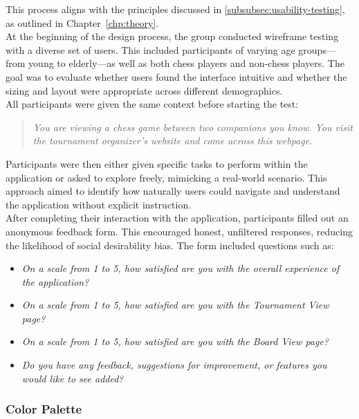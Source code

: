 This process aligns with the principles discussed in \ref{subsubsec:usability-testing}, as outlined in Chapter~\ref{chp:theory}. \\

At the beginning of the design process, the group conducted wireframe testing with a diverse set of users. This included participants of varying age groups—from young to elderly—as well as both chess players and non-chess players. The goal was to evaluate whether users found the interface intuitive and whether the sizing and layout were appropriate across different demographics. \\

All participants were given the same context before starting the test: 

\begin{quote}
\textit{You are viewing a chess game between two companions you know. You visit the tournament organizer's website and come across this webpage.}
\end{quote}

Participants were then either given specific tasks to perform within the application or asked to explore freely, mimicking a real-world scenario. This approach aimed to identify how naturally users could navigate and understand the application without explicit instruction. \\

After completing their interaction with the application, participants filled out an anonymous feedback form. This encouraged honest, unfiltered responses, reducing the likelihood of social desirability bias. The form included questions such as:

\begin{itemize}
    \item \textit{On a scale from 1 to 5, how satisfied are you with the overall experience of the application?}
    \item \textit{On a scale from 1 to 5, how satisfied are you with the Tournament View page?}
    \item \textit{On a scale from 1 to 5, how satisfied are you with the Board View page?}
    \item \textit{Do you have any feedback, suggestions for improvement, or features you would like to see added?}
\end{itemize}

\subsubsection*{Color Palette}
\label{subsubsec:color-palette}


